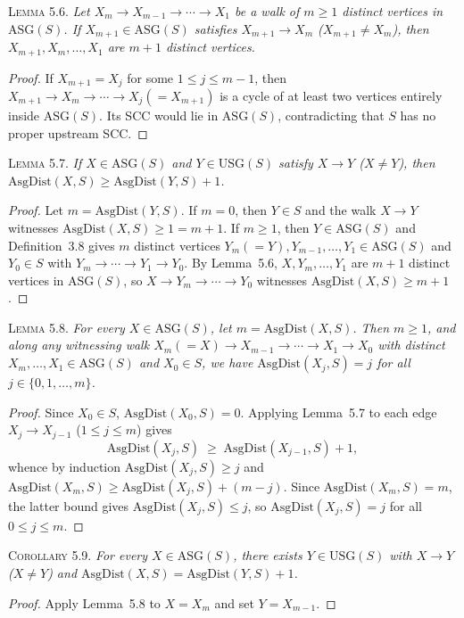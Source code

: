 \documentclass[sigconf,nonacm]{acmart}
\newcommand{\usg}{\mathrm{USG}}
\newcommand{\asg}{\mathrm{ASG}}
\newcommand{\asgdist}{\mathrm{AsgDist}}
\newcommand{\phead}[1]{\par\noindent\textsc{#1.}\enspace}
\begin{document}
\phead{Lemma 5.6}%
\emph{Let \(X_m\to X_{m-1}\to\cdots\to X_1\) be a walk of \(m\ge 1\)
distinct vertices in \(\asg(S)\). If \(X_{m+1}\in\asg(S)\) satisfies
\(X_{m+1}\to X_m\) (\(X_{m+1}\neq X_m\)), then
\(X_{m+1},X_m,\dots,X_1\) are \(m+1\) distinct vertices.}
\begin{proof}
If \(X_{m+1}=X_j\) for some \(1\le j\le m-1\), then
\(X_{m+1}\to X_m\to\cdots\to X_j(=X_{m+1})\) is a cycle of at least two
vertices entirely inside \(\asg(S)\). Its SCC would lie in \(\asg(S)\),
contradicting that \(S\) has no proper upstream SCC.
\end{proof}

\phead{Lemma 5.7}%
\emph{If \(X\in\asg(S)\) and \(Y\in\usg(S)\) satisfy \(X\to Y\)
(\(X\neq Y\)), then \(\asgdist(X,S)\ge\asgdist(Y,S)+1\).}
\begin{proof}
Let \(m=\asgdist(Y,S)\). If \(m=0\), then \(Y\in S\) and the walk
\(X\to Y\) witnesses \(\asgdist(X,S)\ge 1=m+1\). If \(m\ge 1\), then
\(Y\in\asg(S)\) and Definition~3.8 gives \(m\) distinct vertices
\(Y_m(=Y),Y_{m-1},\dots,Y_1\in\asg(S)\) and \(Y_0\in S\) with
\(Y_m\to\cdots\to Y_1\to Y_0\). By Lemma~5.6, \(X,Y_m,\dots,Y_1\) are
\(m+1\) distinct vertices in \(\asg(S)\), so
\(X\to Y_m\to\cdots\to Y_0\) witnesses \(\asgdist(X,S)\ge m+1\).
\end{proof}

\phead{Lemma 5.8}%
\emph{For every \(X\in\asg(S)\), let \(m=\asgdist(X,S)\). Then \(m\ge 1\),
and along any witnessing walk \(X_m(=X)\to X_{m-1}\to\cdots\to X_1\to X_0\)
with distinct \(X_m,\dots,X_1\in\asg(S)\) and \(X_0\in S\), we have
\(\asgdist(X_j,S)=j\) for all \(j\in\{0,1,\dots,m\}\).}
\begin{proof}
Since \(X_0\in S\), \(\asgdist(X_0,S)=0\). Applying Lemma~5.7 to each
edge \(X_j\to X_{j-1}\) (\(1\le j\le m\)) gives
\[
  \asgdist(X_j,S)\;\ge\;\asgdist(X_{j-1},S)+1,
\]
whence by induction \(\asgdist(X_j,S)\ge j\) and
\(\asgdist(X_m,S)\ge\asgdist(X_j,S)+(m-j)\). Since
\(\asgdist(X_m,S)=m\), the latter bound gives \(\asgdist(X_j,S)\le j\),
so \(\asgdist(X_j,S)=j\) for all \(0\le j\le m\).
\end{proof}

\phead{Corollary 5.9}%
\emph{For every \(X\in\asg(S)\), there exists \(Y\in\usg(S)\) with
\(X\to Y\) (\(X\neq Y\)) and \(\asgdist(X,S)=\asgdist(Y,S)+1\).}
\begin{proof}
Apply Lemma~5.8 to \(X=X_m\) and set \(Y=X_{m-1}\).
\end{proof}
\end{document}

